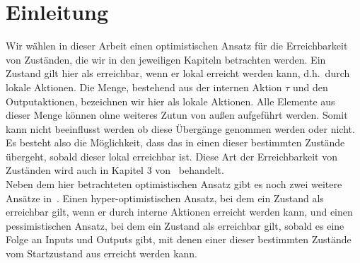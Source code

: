 \chapter{Einleitung}

Wir wählen in dieser Arbeit einen optimistischen Ansatz für die
Erreichbarkeit von Zuständen, die wir in den jeweiligen Kapiteln betrachten
werden. Ein Zustand gilt hier als erreichbar, wenn er lokal
erreicht werden kann, d.h.\ durch lokale Aktionen. Die Menge, bestehend aus der
internen Aktion $\tau$ und den Outputaktionen, bezeichnen wir hier als lokale
Aktionen. Alle Elemente aus dieser Menge können ohne
weiteres Zutun von außen aufgeführt werden. Somit kann nicht beeinflusst werden ob diese
Übergänge genommen werden oder nicht. Es besteht also die Möglichkeit, dass
das \EIO{} in einen dieser bestimmten Zustände übergeht, sobald dieser lokal erreichbar ist. Diese
Art der Erreichbarkeit von Zuständen wird auch in Kapitel 3 von~\cite{Vogler2014EIO}
behandelt.\\
Neben dem hier betrachteten optimistischen Ansatz gibt es noch zwei weitere
Ansätze in~\cite{Vogler2014EIO}. Einen hyper-optimistischen Ansatz, bei dem ein
Zustand als erreichbar gilt, wenn er durch interne Aktionen erreicht werden
kann, und einen pessimistischen Ansatz, bei dem ein Zustand als erreichbar gilt,
sobald es eine Folge an Inputs und Outputs gibt, mit denen einer dieser
bestimmten Zustände vom Startzustand aus erreicht werden kann.\\

